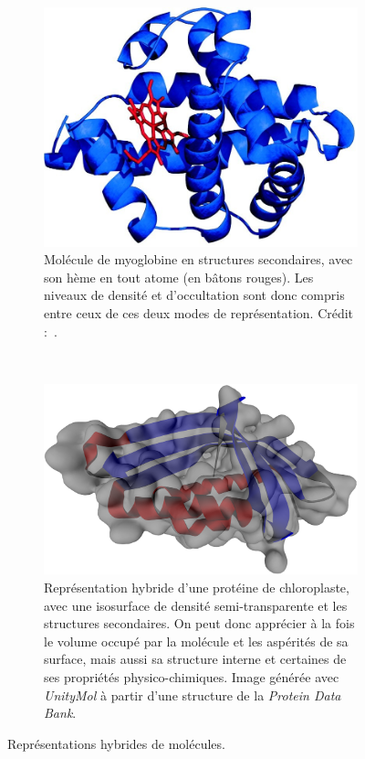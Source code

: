 	\begin{figure}[htb]
		\begin{subfigure}[t]{0.44\textwidth}
			\centering
			\includegraphics[width=\textwidth]{figures/ch1/myoglobin}
			\caption[Représentation hybride d'une protéine]{Molécule de myoglobine en  structures secondaires, avec son hème en \og tout atome \fg{} (en bâtons rouges). Les niveaux de densité et d'occultation sont donc compris entre ceux de ces deux modes de représentation. Crédit :~\cite{Ordway3441}.}
			\label{fig:myoglobin}
		\end{subfigure}
		~
		\begin{subfigure}[t]{0.56\textwidth}
			\centering
			\includegraphics[width=\textwidth]{figures/ch1/transSS}
			\caption[Surface semi-transparente et structures secondaires.]{Représentation hybride d'une protéine de chloroplaste, avec une isosurface de densité semi-transparente et les structures secondaires. On peut donc apprécier à la fois le volume occupé par la molécule et les aspérités de sa surface, mais aussi sa structure interne et certaines de ses propriétés physico-chimiques. Image générée avec \emph{UnityMol} à partir d'une structure de la \emph{Protein Data Bank}.}
			\label{fig:transSS}
		\end{subfigure}
		\label{fig:hybrid}
		\caption{Représentations hybrides de molécules.}
	\end{figure}	
	
